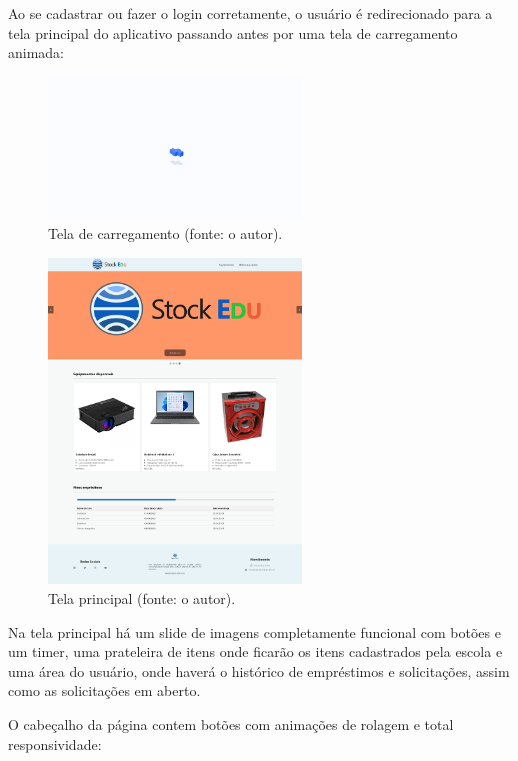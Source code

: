 \documentclass[
	12pt,				%
	openright,			%
	twoside,			%
	a4paper,			%
	english,			%
	french,				%
	spanish,			%
	brazil				%
	]{abntex2}
\begin{document}
Ao se cadastrar ou fazer o login corretamente, o usuário é redirecionado para a tela principal do aplicativo passando antes por uma tela de carregamento animada:

\begin{figure}[htb]
	\centering
	\includegraphics[width=0.6\textwidth]{fig/print4-teladecarregamento.png}
	\caption{Tela de carregamento (fonte: o autor).}
	\label{fig:print4-teladecarregamento}
\end{figure}

\begin{figure}[htb]
	\centering
	\includegraphics[width=0.6\textwidth]{fig/print5-telaprincipal.png}
	\caption{Tela principal (fonte: o autor).}
	\label{fig:print5-telaprincipal}
\end{figure}

Na tela principal há um slide de imagens completamente funcional com botões e um timer, uma prateleira de itens onde ficarão os itens cadastrados pela escola e uma área do usuário, onde haverá o histórico de empréstimos e solicitações, assim como as solicitações em aberto.

O cabeçalho da página contem botões com animações de rolagem e total responsividade:
\end{document}
